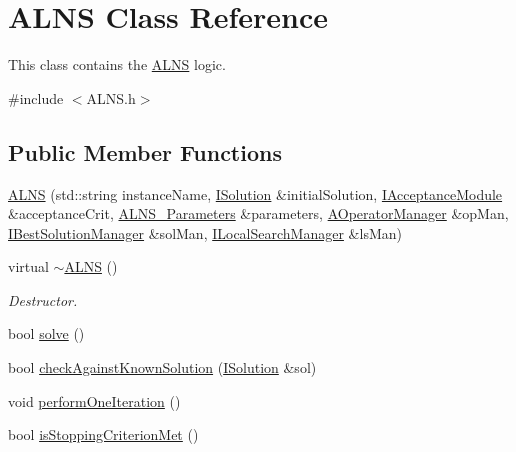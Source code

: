 \hypertarget{classALNS}{\section{A\-L\-N\-S Class Reference}
\label{classALNS}
}


This class contains the \hyperlink{classALNS}{A\-L\-N\-S} logic.  




{\ttfamily \#include $<$A\-L\-N\-S.\-h$>$}

\subsection*{Public Member Functions}
\begin{DoxyCompactItemize}
\item 
\hyperlink{classALNS_a73b1c0d89a08733cf96b8bd3bd3b1ee0}{A\-L\-N\-S} (std\-::string instance\-Name, \hyperlink{classISolution}{I\-Solution} \&initial\-Solution, \hyperlink{classIAcceptanceModule}{I\-Acceptance\-Module} \&acceptance\-Crit, \hyperlink{classALNS__Parameters}{A\-L\-N\-S\-\_\-\-Parameters} \&parameters, \hyperlink{classAOperatorManager}{A\-Operator\-Manager} \&op\-Man, \hyperlink{classIBestSolutionManager}{I\-Best\-Solution\-Manager} \&sol\-Man, \hyperlink{classILocalSearchManager}{I\-Local\-Search\-Manager} \&ls\-Man)
\item 
\hypertarget{classALNS_a981532332c893575df882950ba108420}{virtual \hyperlink{classALNS_a981532332c893575df882950ba108420}{$\sim$\-A\-L\-N\-S} ()}\label{classALNS_a981532332c893575df882950ba108420}

\begin{DoxyCompactList}\small\item\em Destructor. \end{DoxyCompactList}\item 
bool \hyperlink{classALNS_a02bfc43130ca878023ab85da3990aee8}{solve} ()
\item 
bool \hyperlink{classALNS_a603d6dfef21bcb16cb0d4e0ee70dcad8}{check\-Against\-Known\-Solution} (\hyperlink{classISolution}{I\-Solution} \&sol)
\item 
void \hyperlink{classALNS_af86fb8b68cd36fc947c53d53edf37841}{perform\-One\-Iteration} ()
\item 
\hypertarget{classALNS_a914ea0dff7f09b5fd5da9ab8040515a7}{bool \hyperlink{classALNS_a914ea0dff7f09b5fd5da9ab8040515a7}{is\-Stopping\-Criterion\-Met} ()}\label{classALNS_a914ea0dff7f09b5fd5da9ab8040515a7}


\end{DoxyCompactItemize}
